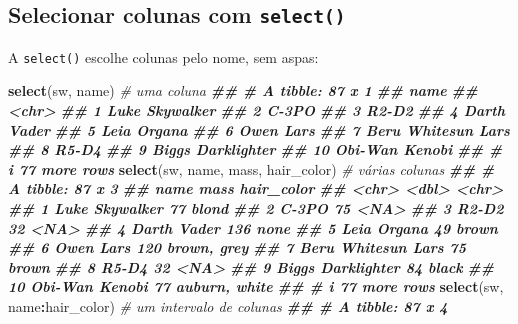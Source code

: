 \documentclass[
  portuguese,
  11pt,
  openany]{book}
\newenvironment{Shaded}{\begin{snugshade}}{\end{snugshade}}
\newcommand{\CommentTok}[1]{\textcolor[rgb]{0.56,0.35,0.01}{\textit{#1}}}
\newcommand{\DocumentationTok}[1]{\textcolor[rgb]{0.56,0.35,0.01}{\textbf{\textit{#1}}}}
\newcommand{\FunctionTok}[1]{\textcolor[rgb]{0.13,0.29,0.53}{\textbf{#1}}}
\newcommand{\NormalTok}[1]{#1}
\newcommand{\SpecialCharTok}[1]{\textcolor[rgb]{0.81,0.36,0.00}{\textbf{#1}}}
\newcounter{none} %
\begin{document}
\subsection{\texorpdfstring{Selecionar colunas com \texttt{select()}}{Selecionar colunas com select()}}\label{selecionar-colunas-com-select}

A \texttt{select()} escolhe colunas pelo nome, sem aspas:

\begin{Shaded}
\begin{Highlighting}[]
\FunctionTok{select}\NormalTok{(sw, name)                       }\CommentTok{\# uma coluna}
\DocumentationTok{\#\# \# A tibble: 87 x 1}
\DocumentationTok{\#\#    name              }
\DocumentationTok{\#\#    \textless{}chr\textgreater{}             }
\DocumentationTok{\#\#  1 Luke Skywalker    }
\DocumentationTok{\#\#  2 C{-}3PO             }
\DocumentationTok{\#\#  3 R2{-}D2             }
\DocumentationTok{\#\#  4 Darth Vader       }
\DocumentationTok{\#\#  5 Leia Organa       }
\DocumentationTok{\#\#  6 Owen Lars         }
\DocumentationTok{\#\#  7 Beru Whitesun Lars}
\DocumentationTok{\#\#  8 R5{-}D4             }
\DocumentationTok{\#\#  9 Biggs Darklighter }
\DocumentationTok{\#\# 10 Obi{-}Wan Kenobi    }
\DocumentationTok{\#\# \# i 77 more rows}
\FunctionTok{select}\NormalTok{(sw, name, mass, hair\_color)     }\CommentTok{\# várias colunas}
\DocumentationTok{\#\# \# A tibble: 87 x 3}
\DocumentationTok{\#\#    name                mass hair\_color   }
\DocumentationTok{\#\#    \textless{}chr\textgreater{}              \textless{}dbl\textgreater{} \textless{}chr\textgreater{}        }
\DocumentationTok{\#\#  1 Luke Skywalker        77 blond        }
\DocumentationTok{\#\#  2 C{-}3PO                 75 \textless{}NA\textgreater{}         }
\DocumentationTok{\#\#  3 R2{-}D2                 32 \textless{}NA\textgreater{}         }
\DocumentationTok{\#\#  4 Darth Vader          136 none         }
\DocumentationTok{\#\#  5 Leia Organa           49 brown        }
\DocumentationTok{\#\#  6 Owen Lars            120 brown, grey  }
\DocumentationTok{\#\#  7 Beru Whitesun Lars    75 brown        }
\DocumentationTok{\#\#  8 R5{-}D4                 32 \textless{}NA\textgreater{}         }
\DocumentationTok{\#\#  9 Biggs Darklighter     84 black        }
\DocumentationTok{\#\# 10 Obi{-}Wan Kenobi        77 auburn, white}
\DocumentationTok{\#\# \# i 77 more rows}
\FunctionTok{select}\NormalTok{(sw, name}\SpecialCharTok{:}\NormalTok{hair\_color)            }\CommentTok{\# um intervalo de colunas}
\DocumentationTok{\#\# \# A tibble: 87 x 4}

\end{Highlighting}
\end{Shaded}
\end{document}
